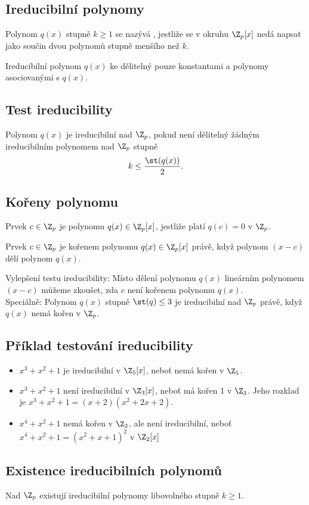 \subsection{Ireducibilní polynomy}
Polynom $q(x)$ stupně $k\geq 1$ se nazývá , jestliže se v okruhu $\Z_p[x]$ nedá napsat jako součin dvou polynomů stupně menšího než $k$.

Ireducibilní polynom $q(x)$ ke dělitelný pouze konstantami a polynomy asociovanými s $q(x)$.

\subsection{Test ireducibility}
Polynom $q(x)$ je ireducibilní nad $\Z_p$, pokud není dělitelný žádným ireducibilním polynomem nad $\Z_p$ stupně
\[
	k \leq \frac{\st(q(x))}{2}.
\]

\subsection{Kořeny polynomu}
Prvek $c \in \Z_p$ je  polynomu $q(x) \in \Z_p[x]$, jestliže platí $q(c) = 0$ v $\Z_p$.

Prvek $c \in \Z_p$ je kořenem polynomu $q(x) \in \Z_p[x]$ právě, když polynom $(x-c)$ dělí polynom $q(x)$.

Vylepšení testu ireducibility: Místo dělení polynomu $q(x)$ lineárním polynomem $(x-c)$ můžeme zkoušet, zda $c$ není kořenem polynomu $q(x)$.\\
Speciálně: Polynom $q(x)$ stupně $\st(q) \leq 3$ je ireducibilní nad $\Z_p$ právě, když $q(x)$ nemá kořen v $\Z_p$.

\subsection{Příklad testování ireducibility}
\begin{itemize}
	\item $x^3 + x^2 + 1$ je ireducibilní v $\Z_5[x]$, neboť nemá kořen v $\Z_5$.
	\item $x^3 + x^2 + 1$ není ireducibilní v $\Z_3[x]$, neboť má kořen 1 v $\Z_3$. Jeho rozklad je $x^3 + x^2 + 1 = (x+2)(x^2 + 2x + 2)$.
	\item $x^4 + x^2 + 1$ nemá kořen v $\Z_2$, ale není ireducibilní, neboť $x^4 + x^2 + 1 = (x^2 + x + 1)^2$ v $\Z_2[x]$
\end{itemize}

\subsection{Existence ireducibilních polynomů}
Nad $\Z_p$ existují ireducibilní polynomy libovolného stupně $k \geq 1$.

